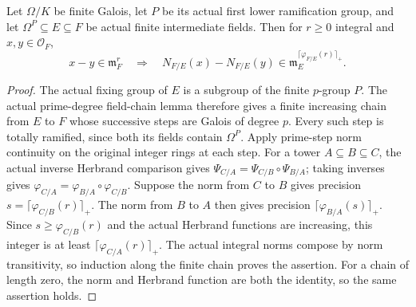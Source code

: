 \begin{lemma}
\label{fw:wild-tower-norm-continuity}
\leanok
Let $\Omega/K$ be finite Galois, let $P$ be its actual first
lower ramification group, and let $\Omega^P\subseteq E\subseteq F$
be actual finite intermediate fields. Then for $r\geq0$ integral
and $x,y\in\mathcal O_F$,
\[
 x-y\in\mathfrak m_F^r\quad\Longrightarrow\quad
 N_{F/E}(x)-N_{F/E}(y)
 \in\mathfrak m_E^{\lceil\varphi_{F/E}(r)\rceil_+}.
\]
\end{lemma}
\begin{proof}
The actual fixing group of $E$ is a subgroup of the finite
$p$-group $P$. The actual prime-degree field-chain lemma
therefore gives a finite increasing chain from $E$ to $F$
whose successive steps are Galois of degree $p$.
Every such step is totally ramified, since both its fields
contain $\Omega^P$. Apply prime-step norm continuity on
the original integer rings at each step.
For a tower $A\subseteq B\subseteq C$, the actual inverse
Herbrand comparison gives
$\Psi_{C/A}=\Psi_{C/B}\circ\Psi_{B/A}$; taking inverses gives
$\varphi_{C/A}=\varphi_{B/A}\circ\varphi_{C/B}$.
Suppose the norm from $C$ to $B$ gives precision
$s=\lceil\varphi_{C/B}(r)\rceil_+$.
The norm from $B$ to $A$ then gives precision
$\lceil\varphi_{B/A}(s)\rceil_+$.
Since $s\geq\varphi_{C/B}(r)$ and the actual Herbrand
functions are increasing, this integer is at least
$\lceil\varphi_{C/A}(r)\rceil_+$.
The actual integral norms compose by norm transitivity,
so induction along the finite chain proves the assertion.
For a chain of length zero, the norm and Herbrand function
are both the identity, so the same assertion holds.
\end{proof}


